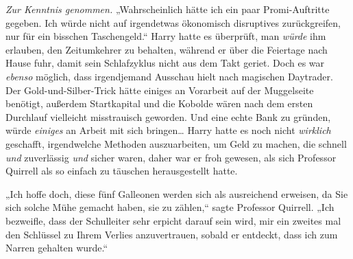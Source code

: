 \emph{Zur Kenntnis genommen.} „Wahrscheinlich hätte ich ein paar Promi-Auftritte gegeben. Ich würde nicht auf irgendetwas ökonomisch disruptives zurückgreifen, nur für ein bisschen Taschengeld.“ Harry hatte es überprüft, man \emph{würde} ihm erlauben, den Zeitumkehrer zu behalten, während er über die Feiertage nach Hause fuhr, damit sein Schlafzyklus nicht aus dem Takt geriet. Doch es war \emph{ebenso} möglich, dass irgendjemand Ausschau hielt nach magischen Daytrader.
Der Gold-und-Silber-Trick hätte einiges an Vorarbeit auf der Muggelseite benötigt, außerdem Startkapital und die Kobolde wären nach dem ersten Durchlauf vielleicht misstrauisch geworden. Und eine echte Bank zu gründen, würde \emph{einiges} an Arbeit mit sich bringen… Harry hatte es noch nicht \emph{wirklich} geschafft, irgendwelche Methoden auszuarbeiten, um Geld zu machen, die schnell \emph{und} zuverlässig \emph{und} sicher waren, daher war er froh gewesen, als sich Professor Quirrell als so einfach zu täuschen herausgestellt hatte.

„Ich hoffe doch, diese fünf Galleonen werden sich als ausreichend erweisen, da Sie sich solche Mühe gemacht haben, sie zu zählen,“ sagte Professor Quirrell. „Ich bezweifle, dass der Schulleiter sehr erpicht darauf sein wird, mir ein zweites mal den Schlüssel zu Ihrem Verlies anzuvertrauen, sobald er entdeckt, dass ich zum Narren gehalten wurde.“

